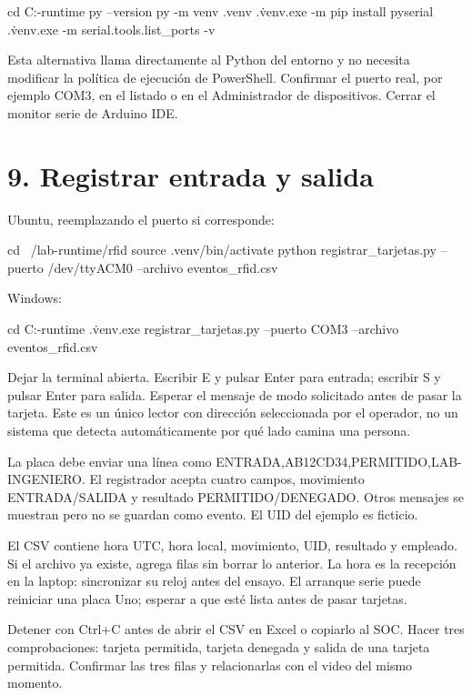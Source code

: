 \documentclass[12pt,a4paper]{article}
\begin{document}
\begin{Comandos}
cd C:\lab-runtime\rfid
py --version
py -m venv .venv
.\.venv\Scripts\python.exe -m pip install pyserial
.\.venv\Scripts\python.exe -m serial.tools.list_ports -v
\end{Comandos}
Esta alternativa llama directamente al Python del entorno y no necesita modificar la política de ejecución de PowerShell. Confirmar el puerto real, por ejemplo \textnormal{COM3}, en el listado o en el Administrador de dispositivos. Cerrar el monitor serie de Arduino IDE.\par
{}\section*{9. Registrar entrada y salida}
Ubuntu, reemplazando el puerto si corresponde:\par
{}
\begin{Comandos}
cd ~/lab-runtime/rfid
source .venv/bin/activate
python registrar_tarjetas.py --puerto /dev/ttyACM0 --archivo eventos_rfid.csv
\end{Comandos}
Windows:\par
{}
\begin{Comandos}
cd C:\lab-runtime\rfid
.\.venv\Scripts\python.exe registrar_tarjetas.py --puerto COM3 --archivo eventos_rfid.csv
\end{Comandos}
Dejar la terminal abierta. Escribir \textnormal{E} y pulsar Enter para entrada; escribir \textnormal{S} y pulsar Enter para salida. Esperar el mensaje de modo solicitado antes de pasar la tarjeta. Este es un único lector con dirección seleccionada por el operador, no un sistema que detecta automáticamente por qué lado camina una persona.\par
La placa debe enviar una línea como \textnormal{ENTRADA,AB12CD34,PERMITIDO,LAB-INGENIERO}. El registrador acepta cuatro campos, movimiento ENTRADA/SALIDA y resultado PERMITIDO/DENEGADO. Otros mensajes se muestran pero no se guardan como evento. El UID del ejemplo es ficticio.\par
El CSV contiene hora UTC, hora local, movimiento, UID, resultado y empleado. Si el archivo ya existe, agrega filas sin borrar lo anterior. La hora es la recepción en la laptop: sincronizar su reloj antes del ensayo. El arranque serie puede reiniciar una placa Uno; esperar a que esté lista antes de pasar tarjetas.\par
Detener con Ctrl+C antes de abrir el CSV en Excel o copiarlo al SOC. Hacer tres comprobaciones: tarjeta permitida, tarjeta denegada y salida de una tarjeta permitida. Confirmar las tres filas y relacionarlas con el video del mismo momento.\par
\end{document}
